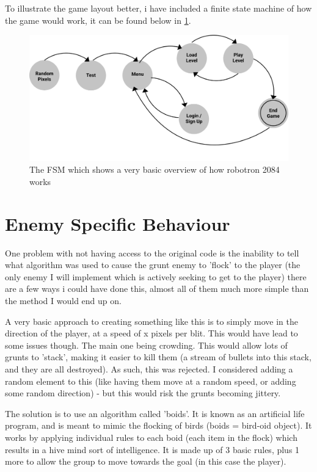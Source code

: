 To illustrate the game layout better, i have included a finite state machine of how the game would work, it can be found below in \ref{fig:Robotron_FSM}.

\begin{figure}[ht!]
  \includegraphics[width=0.8\linewidth]{Figures/FSM_robotrom.png}
  \centering
  \caption{The FSM which shows a very basic overview of how robotron 2084 works}
  \label{fig:Robotron_FSM}
\end{figure}


\section{Enemy Specific Behaviour}
One problem with not having access to the original code is the inability to tell what algorithm was used to cause the grunt enemy to 'flock' to the player (the only enemy I will implement which is actively seeking to get to the player) there are a few ways i could have done this, almost all of them much more simple than the method I would end up on.

A very basic approach to creating something like this is to simply move in the direction of the player, at a speed of x pixels per blit. This would have lead to some issues though. The main one being crowding. This would allow lots of grunts to 'stack', making it easier to kill them (a stream of bullets into this stack, and they are all destroyed). As such, this was rejected. I considered adding a random element to this (like having them move at a random speed, or adding some random direction) - but this would risk the grunts becoming jittery.

The solution is to use an algorithm called 'boids'. It is known as an artificial life program, and is meant to mimic the flocking of birds (boids = bird-oid object). It works by applying individual rules to each boid (each item in the flock) which results in a hive mind sort of intelligence. It is made up of 3 basic rules, plus 1 more to allow the group to move towards the goal (in this case the player).

